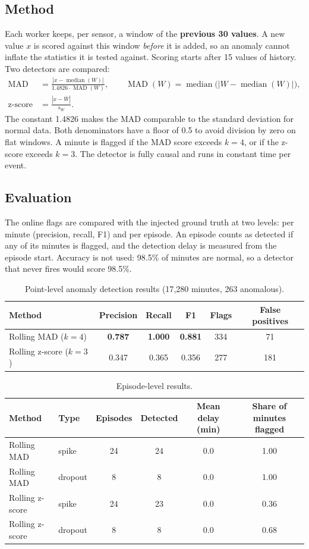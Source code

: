 \documentclass[11pt]{article}
\begin{document}
\subsection{Method}
Each worker keeps, per sensor, a window of the \textbf{previous 30 values}. A new value $x$ is scored against this window \emph{before} it is added, so an anomaly cannot inflate the statistics it is tested against. Scoring starts after 15 values of history. Two detectors are compared:
\begin{align}
\text{MAD score} &= \frac{|x-\operatorname{median}(W)|}{1.4826\cdot\operatorname{MAD}(W)}, \qquad \operatorname{MAD}(W)=\operatorname{median}\big(|W-\operatorname{median}(W)|\big), \\
\text{z-score} &= \frac{|x-\bar W|}{s_W}.
\end{align}
The constant 1.4826 makes the MAD comparable to the standard deviation for normal data. Both denominators have a floor of 0.5 to avoid division by zero on flat windows. A minute is flagged if the MAD score exceeds $k=4$, or if the z-score exceeds $k=3$. The detector is fully causal and runs in constant time per event.

\subsection{Evaluation}
The online flags are compared with the injected ground truth at two levels: per minute (precision, recall, F1) and per episode. An episode counts as detected if any of its minutes is flagged, and the detection delay is measured from the episode start. Accuracy is not used: 98.5\% of minutes are normal, so a detector that never fires would score 98.5\%.

\begin{table}[H]
\centering\small
\begin{tabular}{@{}lccccc@{}}
\toprule
Method & Precision & Recall & F1 & Flags & False positives \\
\midrule
Rolling MAD ($k=4$) & \textbf{0.787} & \textbf{1.000} & \textbf{0.881} & 334 & 71 \\
Rolling z-score ($k=3$) & 0.347 & 0.365 & 0.356 & 277 & 181 \\
\bottomrule
\end{tabular}
\caption{Point-level anomaly detection results (17{,}280 minutes, 263 anomalous).}
\label{tab:anom}
\end{table}

\begin{table}[H]
\centering\small
\begin{tabular}{@{}llcccc@{}}
\toprule
Method & Type & Episodes & Detected & Mean delay (min) & Share of minutes flagged \\
\midrule
Rolling MAD & spike & 24 & 24 & 0.0 & 1.00 \\
Rolling MAD & dropout & 8 & 8 & 0.0 & 1.00 \\
Rolling z-score & spike & 24 & 23 & 0.0 & 0.36 \\
Rolling z-score & dropout & 8 & 8 & 0.0 & 0.68 \\
\bottomrule
\end{tabular}
\caption{Episode-level results.}
\label{tab:episodes}
\end{table}
\end{document}
